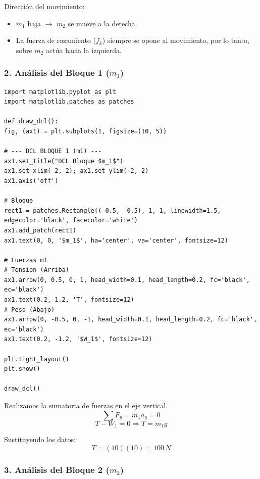 \documentclass[12pt, a4paper]{article}
\begin{document}
Dirección del movimiento:
\begin{itemize}
    \item $m_1$ baja $\rightarrow$ $m_2$ se mueve a la derecha.
    \item La fuerza de rozamiento ($f_k$) siempre se opone al movimiento, por lo tanto, sobre $m_2$ actúa hacia la izquierda.
\end{itemize}

\subsubsection*{2. Análisis del Bloque 1 ($m_1$)}
\begin{lstlisting}
import matplotlib.pyplot as plt
import matplotlib.patches as patches

def draw_dcl():
fig, (ax1) = plt.subplots(1, figsize=(10, 5))
    
# --- DCL BLOQUE 1 (m1) ---
ax1.set_title("DCL Bloque $m_1$")
ax1.set_xlim(-2, 2); ax1.set_ylim(-2, 2)
ax1.axis('off')
    
# Bloque
rect1 = patches.Rectangle((-0.5, -0.5), 1, 1, linewidth=1.5, edgecolor='black', facecolor='white')
ax1.add_patch(rect1)
ax1.text(0, 0, '$m_1$', ha='center', va='center', fontsize=12)
    
# Fuerzas m1
# Tension (Arriba)
ax1.arrow(0, 0.5, 0, 1, head_width=0.1, head_length=0.2, fc='black', ec='black')
ax1.text(0.2, 1.2, 'T', fontsize=12)
# Peso (Abajo)
ax1.arrow(0, -0.5, 0, -1, head_width=0.1, head_length=0.2, fc='black', ec='black')
ax1.text(0.2, -1.2, '$W_1$', fontsize=12)
    
plt.tight_layout()
plt.show()

draw_dcl()
\end{lstlisting}

Realizamos la sumatoria de fuerzas en el eje vertical.
$$ \sum F_y = m_1 a_y = 0 $$
$$ T - W_1 = 0 \Rightarrow T = m_1 g $$

Sustituyendo los datos:
$$ T = (10)(10) = 100 \, \si{N} $$


\subsubsection*{3. Análisis del Bloque 2 ($m_2$)}
\end{document}
